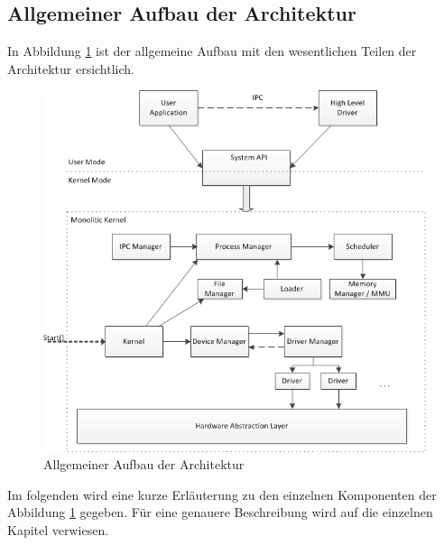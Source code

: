 \subsection{Allgemeiner Aufbau der Architektur}
\label{section:generalArchitecture}
In Abbildung \ref{fig:general-Architecture} ist der allgemeine Aufbau mit den wesentlichen Teilen der Architektur ersichtlich. 

\begin{figure}[H]
	\includegraphics[scale=0.9]{chapters/architecture/figures/architecture}
	\caption{Allgemeiner Aufbau der Architektur}
	\label{fig:general-Architecture}
\end{figure}

Im folgenden wird eine kurze Erläuterung zu den einzelnen Komponenten der Abbildung \ref{fig:general-Architecture} gegeben. Für eine genauere Beschreibung wird auf die einzelnen Kapitel verwiesen. \\

